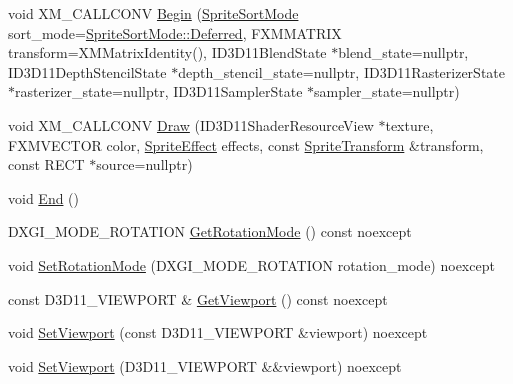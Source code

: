 \begin{DoxyCompactItemize}
\item 
void X\+M\+\_\+\+C\+A\+L\+L\+C\+O\+NV \hyperlink{classmage_1_1_sprite_batch_a76458df59d4fa6fe99d4dae375bf0fc5}{Begin} (\hyperlink{namespacemage_a256fa5833eecc408923de7ffadb5e014}{Sprite\+Sort\+Mode} sort\+\_\+mode=\hyperlink{namespacemage_a5e7e18b0154373ce8fc942fe3f6b27fda4ed71db54748b36eeb398876b0c747ac}{Sprite\+Sort\+Mode\+::\+Deferred}, F\+X\+M\+M\+A\+T\+R\+IX transform=X\+M\+Matrix\+Identity(), I\+D3\+D11\+Blend\+State $\ast$blend\+\_\+state=nullptr, I\+D3\+D11\+Depth\+Stencil\+State $\ast$depth\+\_\+stencil\+\_\+state=nullptr, I\+D3\+D11\+Rasterizer\+State $\ast$rasterizer\+\_\+state=nullptr, I\+D3\+D11\+Sampler\+State $\ast$sampler\+\_\+state=nullptr)
\item 
void X\+M\+\_\+\+C\+A\+L\+L\+C\+O\+NV \hyperlink{classmage_1_1_sprite_batch_aa1c49a91ab7f863ec51276d496ae1e66}{Draw} (I\+D3\+D11\+Shader\+Resource\+View $\ast$texture, F\+X\+M\+V\+E\+C\+T\+OR color, \hyperlink{namespacemage_a9cfe18123066ba4236f548f9de75d881}{Sprite\+Effect} effects, const \hyperlink{structmage_1_1_sprite_transform}{Sprite\+Transform} \&transform, const R\+E\+CT $\ast$source=nullptr)
\item 
void \hyperlink{classmage_1_1_sprite_batch_a9764372bb18b1c24a4a2f64ab0649569}{End} ()
\item 
D\+X\+G\+I\+\_\+\+M\+O\+D\+E\+\_\+\+R\+O\+T\+A\+T\+I\+ON \hyperlink{classmage_1_1_sprite_batch_ae38132bcf084f268dae7bfcc3b9c9a4d}{Get\+Rotation\+Mode} () const noexcept
\item 
void \hyperlink{classmage_1_1_sprite_batch_a59ec5e96a62bcd674cbf0d22f152b17f}{Set\+Rotation\+Mode} (D\+X\+G\+I\+\_\+\+M\+O\+D\+E\+\_\+\+R\+O\+T\+A\+T\+I\+ON rotation\+\_\+mode) noexcept
\item 
const D3\+D11\+\_\+\+V\+I\+E\+W\+P\+O\+RT \& \hyperlink{classmage_1_1_sprite_batch_ab4f95db776d7c20896f9420bc60d90c8}{Get\+Viewport} () const noexcept
\item 
void \hyperlink{classmage_1_1_sprite_batch_a5b02194c2bdbbe5b04e95ab401e6de4e}{Set\+Viewport} (const D3\+D11\+\_\+\+V\+I\+E\+W\+P\+O\+RT \&viewport) noexcept
\item 
void \hyperlink{classmage_1_1_sprite_batch_aef86940ffc869785fb8ff8eb85ab7b46}{Set\+Viewport} (D3\+D11\+\_\+\+V\+I\+E\+W\+P\+O\+RT \&\&viewport) noexcept
\end{DoxyCompactItemize}
